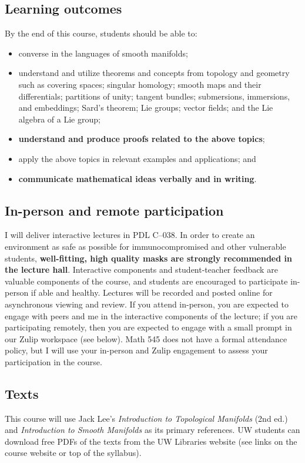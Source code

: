 \documentclass[11pt,twoside]{amsart}
\begin{document}
\subsection*{Learning outcomes}
By the end of this course, students should be able to:
\begin{itemize}
\item converse in the languages of smooth manifolds;
\item understand and utilize theorems and concepts from topology and geometry such as covering spaces; singular homology; smooth maps and their differentials; partitions of unity; tangent bundles; submersions, immersions, and embeddings; Sard's theorem; Lie groups; vector fields; and the Lie algebra of a Lie group;
\item \textbf{understand and produce proofs related to the above topics};
\item apply the above topics in relevant examples and applications; and
\item \textbf{communicate mathematical ideas verbally and in writing}.
\end{itemize}

\subsection*{In-person and remote participation}
I will deliver interactive lectures in PDL C--038. In order to create an environment as safe as possible for immunocompromised and other vulnerable students, \textbf{well-fitting, high quality masks are strongly recommended in the lecture hall}.  Interactive components and student-teacher feedback are valuable components of the course, and students are encouraged to participate in-person if able and healthy. Lectures will be recorded and posted online for asynchronous viewing and review.  If you attend in-person, you are expected to engage with peers and me in the interactive components of the lecture; if you are participating remotely, then you are expected to engage with a small prompt in our Zulip workspace (see below). Math 545 does not have a formal attendance policy, but I will use your in-person and Zulip engagement to assess your participation in the course.

\subsection*{Texts}
This course will use Jack Lee's \emph{Introduction to Topological Manifolds} (2nd ed.) and \emph{Introduction to Smooth Manifolds} as its primary references. UW students can download free PDFs of the texts from the UW Libraries website (see links on the course website or top of the syllabus).
\end{document}
